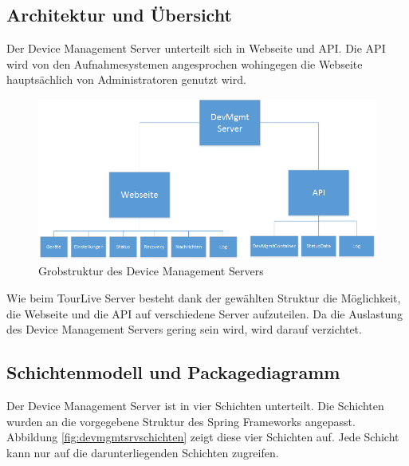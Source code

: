 \subsection{Architektur und Übersicht}
Der Device Management Server unterteilt sich in Webseite und API. Die API wird von den Aufnahmesystemen angesprochen wohingegen die Webseite hauptsächlich von Administratoren genutzt wird.



\begin{figure}[H]
	\centering
	\includegraphics[width=130mm]{images/devmgmtsrv/uebersicht.png}
	\caption{Grobstruktur des Device Management Servers}
\end{figure}

Wie beim TourLive Server besteht dank der gewählten Struktur die Möglichkeit, die Webseite und die API auf verschiedene Server aufzuteilen. Da die Auslastung des Device Management Servers gering sein wird, wird darauf verzichtet.

\subsection{Schichtenmodell und Packagediagramm}
Der Device Management Server ist in vier Schichten unterteilt. Die Schichten wurden an die vorgegebene Struktur des Spring Frameworks angepasst. Abbildung \ref{fig:devmgmtsrvschichten} zeigt diese vier Schichten auf. Jede Schicht kann nur auf die darunterliegenden Schichten zugreifen.

